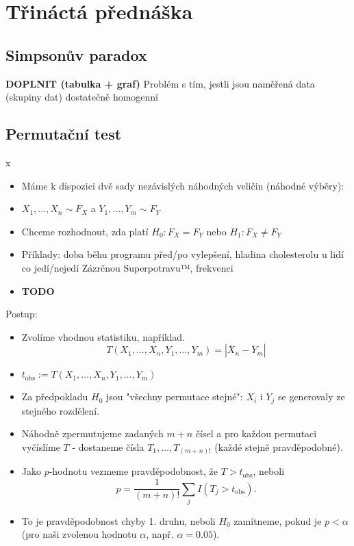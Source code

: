 \documentclass[../main.tex]{subfiles}
\begin{document}
\section{Třináctá přednáška}

\subsection{Simpsonův paradox}
\textbf{DOPLNIT (tabulka + graf)}
Problém s tím, jestli jsou naměřená data (skupiny dat) dostatečně homogenní

\subsection{Permutační test}
\begin{example}
    {\color{white} x}
    \begin{itemize}
        \item Máme k dispozici dvě sady nezávislých náhodných veličin (náhodné výběry):
        \item $X_1,\dots,X_n \sim F_X$ a $Y_1,\dots,Y_m \sim F_Y$
        \item Chceme rozhodnout, zda platí $H_0 : F_X = F_Y$ nebo $H_1 : F_X \neq F_Y$
        \item Příklady: doba běhu programu před/po vylepšení, hladina cholesterolu u lidí co jedí/nejedí Zázrčnou Superpotravu™, frekvenci
        \item \textbf{TODO} 
    \end{itemize}
    Postup:
    \begin{itemize}
        \item Zvolíme vhodnou statistiku, například.
        \[T(X_1,\dots,X_n,Y_1,\dots,Y_m) = |\overline{X}_n - \overline{Y}_m|\]
        \item $t_{\text{obs}} := T(X_1,\dots,X_n, Y_1,\dots,Y_m)$
        \item Za předpokladu $H_0$ jsou "všechny permutace stejné": $X_i$ i $Y_j$ se generovaly ze stejného rozdělení.
        \item Náhodně zpermutujeme zadaných $m+n$ čísel a pro každou permutaci vyčíslíme $T$ - dostaneme čísla $T_1,\dots,T_{(m+n)!}$ (každé stejně pravděpodobné).
        \item Jako $p$-hodnotu vezmeme pravděpodobnost, že $T > t_{\text{obs}}$, neboli
        \[p = \frac{1}{(m+n)!}\sum_{j} I(T_j>t_{\text{obs}}).\]
        \item To je pravděpodobnost chyby 1. druhu, neboli $H_0$ zamítneme, pokud je $p<\alpha$ (pro naši zvolenou hodnotu $\alpha$, např. $\alpha = 0.05$).

\end{itemize}
\end{example}
\end{document}
